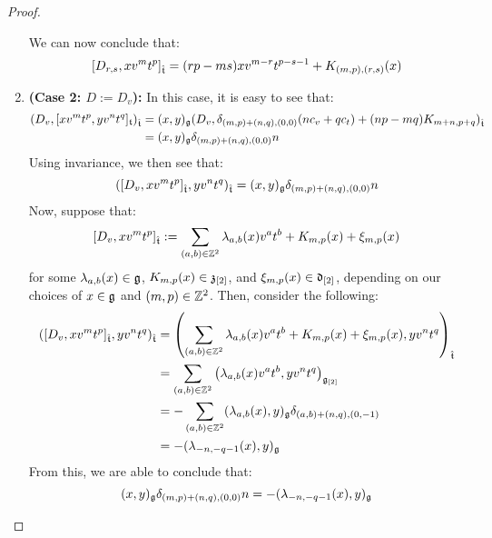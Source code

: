 \begin{proof}
\begin{enumerate}
                    We can now conclude that:
                        $$[D_{r, s}, x v^m t^p]_{\hat{\mathfrak{t}}} = ( rp - ms ) x v^{m - r} t^{p - s - 1} + K_{(m, p), (r, s)}(x)$$
                    \item \textbf{(Case 2: $D := D_v$):} In this case, it is easy to see that:
                        $$
                            \begin{aligned}
                                ( D_v, [x v^m t^p, y v^n t^q]_{\mathfrak{t}} )_{\hat{\mathfrak{t}}} & = (x, y)_{\mathfrak{g}} ( D_v, \delta_{(m, p) + (n, q), (0, 0)} ( n c_v + q c_t ) + (np - mq) K_{m + n, p + q} )_{\hat{\mathfrak{t}}}
                                \\
                                & = (x, y)_{\mathfrak{g}} \delta_{(m, p) + (n, q), (0, 0)} n
                            \end{aligned}
                        $$
                    Using invariance, we then see that:
                        $$( [D_v, x v^m t^p]_{\hat{\mathfrak{t}}}, y v^n t^q )_{\hat{\mathfrak{t}}} = (x, y)_{\mathfrak{g}} \delta_{(m, p) + (n, q), (0, 0)} n$$
                    Now, suppose that:
                        $$[D_v, x v^m t^p]_{\hat{\mathfrak{t}}} := \sum_{(a, b) \in \mathbb{Z}^2} \lambda_{a, b}(x) v^a t^b + K_{m, p}(x) + \xi_{m, p}(x)$$
                    for some $\lambda_{a, b}(x) \in \mathfrak{g}$, $K_{m, p}(x) \in \mathfrak{z}_{[2]}$, and $\xi_{m, p}(x) \in \mathfrak{d}_{[2]}$, depending on our choices of $x \in \mathfrak{g}$ and $(m, p) \in \mathbb{Z}^2$. Then, consider the following:
                        $$
                            \begin{aligned}
                                ( [D_v, x v^m t^p]_{\hat{\mathfrak{t}}}, y v^n t^q )_{\hat{\mathfrak{t}}} & = \left( \sum_{(a, b) \in \mathbb{Z}^2} \lambda_{a, b}(x) v^a t^b + K_{m, p}(x) + \xi_{m, p}(x), y v^n t^q \right)_{\hat{\mathfrak{t}}}
                                \\
                                & = \sum_{(a, b) \in \mathbb{Z}^2} \left( \lambda_{a, b}(x) v^a t^b, y v^n t^q \right)_{\mathfrak{g}_{[2]}}
                                \\
                                & = -\sum_{(a, b) \in \mathbb{Z}^2} (\lambda_{a, b}(x), y)_{\mathfrak{g}} \delta_{ (a, b) + (n, q), (0, -1) }
                                \\
                                & = -(\lambda_{-n, -q - 1}(x), y)_{\mathfrak{g}}
                            \end{aligned}
                        $$
                    From this, we are able to conclude that:
                        $$(x, y)_{\mathfrak{g}} \delta_{(m, p) + (n, q), (0, 0)} n = -(\lambda_{-n, -q - 1}(x), y)_{\mathfrak{g}}$$

\end{enumerate}
\end{proof}
